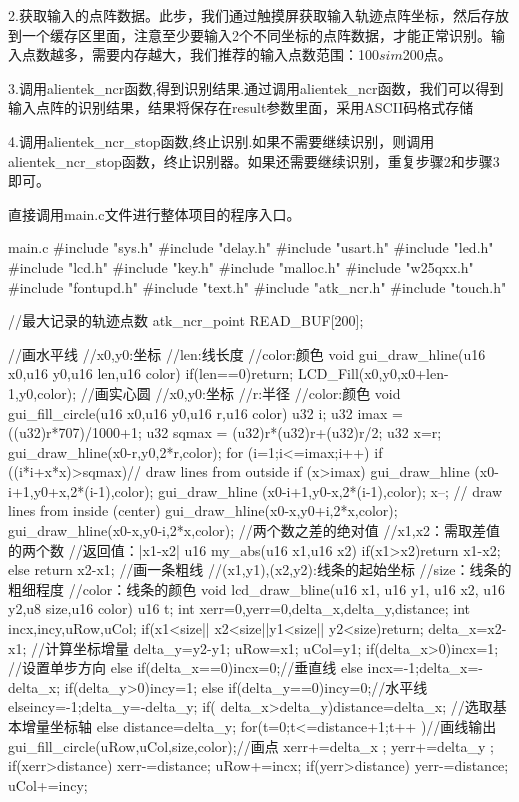 \documentclass[UTF8]{ctexart}
\begin{document}
2.获取输入的点阵数据。此步，我们通过触摸屏获取输入轨迹点阵坐标，然后存放到一个缓存区里面，注意至少要输入2个不同坐标的点阵数据，才能正常识别。输入点数越多，需要内存越大，我们推荐的输入点数范围：100$sim$200点。

3.调用alientek\_ncr函数,得到识别结果.通过调用alientek\_ncr函数，我们可以得到输入点阵的识别结果，结果将保存在result参数里面，采用ASCII码格式存储 

4.调用alientek\_ncr\_stop函数,终止识别.如果不需要继续识别，则调用alientek\_ncr\_stop函数，终止识别器。如果还需要继续识别，重复步骤2和步骤3即可。

直接调用main.c文件进行整体项目的程序入口。
\begin{Python}{main.c}
		#include "sys.h"
	#include "delay.h"  
	#include "usart.h"   
	#include "led.h"
	#include "lcd.h"
	#include "key.h"  
	#include "malloc.h" 
	#include "w25qxx.h"       
	#include "fontupd.h"
	#include "text.h"   
	#include "atk_ncr.h"
	#include "touch.h"		

	//最大记录的轨迹点数
	atk_ncr_point READ_BUF[200];					 
	
	//画水平线
	//x0,y0:坐标
	//len:线长度
	//color:颜色
	void gui_draw_hline(u16 x0,u16 y0,u16 len,u16 color)
	{
		if(len==0)return;
		LCD_Fill(x0,y0,x0+len-1,y0,color);	
	}
	//画实心圆
	//x0,y0:坐标
	//r:半径
	//color:颜色
	void gui_fill_circle(u16 x0,u16 y0,u16 r,u16 color)
	{											  
		u32 i;
		u32 imax = ((u32)r*707)/1000+1;
		u32 sqmax = (u32)r*(u32)r+(u32)r/2;
		u32 x=r;
		gui_draw_hline(x0-r,y0,2*r,color);
		for (i=1;i<=imax;i++) 
		{
			if ((i*i+x*x)>sqmax)// draw lines from outside  
			{
				if (x>imax) 
				{
					gui_draw_hline (x0-i+1,y0+x,2*(i-1),color);
					gui_draw_hline (x0-i+1,y0-x,2*(i-1),color);
				}
				x--;
			}
			// draw lines from inside (center)  
			gui_draw_hline(x0-x,y0+i,2*x,color);
			gui_draw_hline(x0-x,y0-i,2*x,color);
		}
	}  
	//两个数之差的绝对值 
	//x1,x2：需取差值的两个数
	//返回值：|x1-x2|
	u16 my_abs(u16 x1,u16 x2)
	{			 
		if(x1>x2)return x1-x2;
		else return x2-x1;
	}  
	//画一条粗线
	//(x1,y1),(x2,y2):线条的起始坐标
	//size：线条的粗细程度
	//color：线条的颜色
	void lcd_draw_bline(u16 x1, u16 y1, u16 x2, u16 y2,u8 size,u16 color)
	{
		u16 t; 
		int xerr=0,yerr=0,delta_x,delta_y,distance; 
		int incx,incy,uRow,uCol; 
		if(x1<size|| x2<size||y1<size|| y2<size)return; 
		delta_x=x2-x1; //计算坐标增量 
		delta_y=y2-y1; 
		uRow=x1; 
		uCol=y1; 
		if(delta_x>0)incx=1; //设置单步方向 
		else if(delta_x==0)incx=0;//垂直线 
		else {incx=-1;delta_x=-delta_x;} 
		if(delta_y>0)incy=1; 
		else if(delta_y==0)incy=0;//水平线 
		else{incy=-1;delta_y=-delta_y;} 
		if( delta_x>delta_y)distance=delta_x; //选取基本增量坐标轴 
		else distance=delta_y; 
		for(t=0;t<=distance+1;t++ )//画线输出 
		{  
			gui_fill_circle(uRow,uCol,size,color);//画点 
			xerr+=delta_x ; 
			yerr+=delta_y ; 
			if(xerr>distance) 
			{ 
				xerr-=distance; 
				uRow+=incx; 
			} 
			if(yerr>distance) 
			{ 
				yerr-=distance; 
				uCol+=incy; 
			} 
		}  
	}
	

\end{Python}
\end{document}
